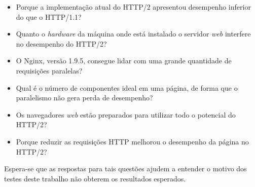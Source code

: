 \begin{itemize}
	\item Porque a implementação atual do HTTP/2 apresentou desempenho inferior do que o HTTP/1.1?
	\item Quanto o \textit{hardware} da máquina onde está instalado o servidor \textit{web} interfere no desempenho do HTTP/2?
	\item O Nginx, versão 1.9.5, consegue lidar com uma grande quantidade de requisições paralelas?
	\item Qual é o número de componentes ideal em uma página, de forma que o paralelismo não gera perda de desempenho?
	\item Os navegadores \textit{web} estão preparados para utilizar todo o potencial do HTTP/2?
	\item Porque reduzir as requisições HTTP melhorou o desempenho da página no HTTP/2?
\end{itemize}

Espera-se que as respostas para tais questões ajudem a entender o motivo dos testes deste trabalho não obterem os resultados esperados.